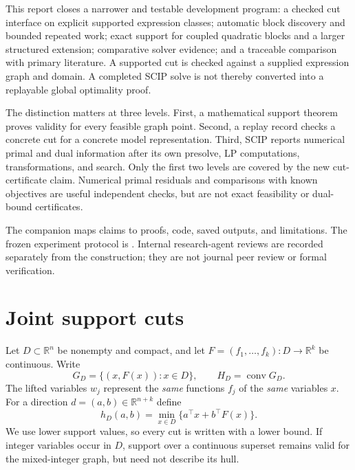 \documentclass[11pt]{article}
\theoremstyle{definition}
\theoremstyle{remark}
\newcommand{\R}{\mathbb R}
\newcommand{\conv}{\operatorname{conv}}
\newcommand{\pathref}[2]{\href{run:#1}{\texttt{\detokenize{#2}}}}
\begin{document}
This report closes a narrower and testable development program: a checked
cut interface on explicit supported expression classes; automatic block
discovery and bounded repeated work; exact support for coupled quadratic
blocks and a larger structured extension; comparative solver evidence;
and a traceable comparison with primary literature. A supported cut is
checked against a supplied expression graph and domain. A completed SCIP
solve is not thereby converted into a replayable global optimality proof.

The distinction matters at three levels. First, a mathematical support
theorem proves validity for every feasible graph point. Second, a replay
record checks a concrete cut for a concrete model representation. Third,
SCIP reports numerical primal and dual information after its own presolve,
LP computations, transformations, and search. Only the first two levels
are covered by the new cut-certificate claim. Numerical primal residuals
and comparisons with known objectives are useful independent checks, but
are not exact feasibility or dual-bound certificates.

The companion \pathref{COVERAGE.md}{COVERAGE.md} maps claims to proofs,
code, saved outputs, and limitations. The frozen experiment protocol is
\pathref{../experiments/protocol.md}{experiments/protocol.md}. Internal
research-agent reviews are recorded separately from the construction;
they are not journal peer review or formal verification.

\section{Joint support cuts}\label{sec:support}

Let $D\subset\R^n$ be nonempty and compact, and let
$F=(f_1,\ldots,f_k):D\to\R^k$ be continuous. Write
\[
G_D=\{(x,F(x)):x\in D\},\qquad H_D=\conv G_D.
\]
The lifted variables $w_j$ represent the \emph{same} functions $f_j$ of
the \emph{same} variables $x$. For a direction $d=(a,b)\in\R^{n+k}$ define
\begin{equation}\label{eq:support}
h_D(a,b)=\min_{x\in D}\{a^\top x+b^\top F(x)\}.
\end{equation}
We use lower support values, so every cut is written with a lower bound.
If integer variables occur in $D$, support over a continuous superset
remains valid for the mixed-integer graph, but need not describe its hull.
\end{document}
